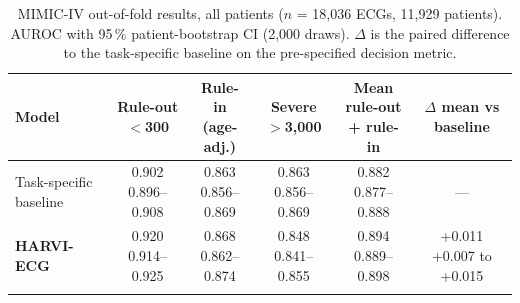 \documentclass[10pt]{article}
\begin{document}
\begin{table}[t]\centering\small\setlength{\tabcolsep}{4pt}
\caption{MIMIC-IV out-of-fold results, all patients ($n$ = 18{,}036 ECGs, 11{,}929 patients). AUROC with 95\,\% patient-bootstrap CI (2{,}000 draws). $\Delta$ is the paired difference to the task-specific baseline on the pre-specified decision metric.}\label{tab:int}
\begin{tabular}{@{}lccccc@{}}\toprule
Model & \makecell{Rule-out\\$<$300} & \makecell{Rule-in\\(age-adj.)} & \makecell{Severe\\$>$3{,}000} & \makecell{Mean rule-out\\+ rule-in} & \makecell{$\Delta$ mean vs\\baseline} \\\midrule
Task-specific baseline & \makecell{0.902\\ {\scriptsize 0.896--0.908}} & \makecell{0.863\\ {\scriptsize 0.856--0.869}} & \makecell{0.863\\ {\scriptsize 0.856--0.869}} & \makecell{0.882\\ {\scriptsize 0.877--0.888}} & --- \\ \addlinespace[2pt]
\textbf{HARVI-ECG} & \makecell{0.920\\ {\scriptsize 0.914--0.925}} & \makecell{0.868\\ {\scriptsize 0.862--0.874}} & \makecell{0.848\\ {\scriptsize 0.841--0.855}} & \makecell{0.894\\ {\scriptsize 0.889--0.898}} & \makecell{+0.011\\ {\scriptsize +0.007 to +0.015}} \\ \addlinespace[2pt]
\bottomrule\end{tabular}\end{table}
\end{document}
